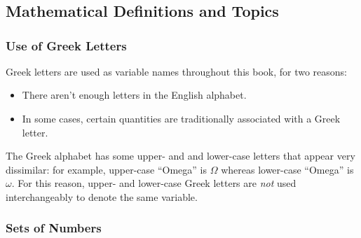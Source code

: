 \chapter[\cmctzeroshorttitle{}]{\cmctzeroshorttitle{}}

\label{cmct0}

\section{Mathematical Definitions and Topics}
\label{cmct0:smtp0}


\subsection{Use of Greek Letters}
\label{cmct0:smtp0:sugl0}

Greek letters are used as variable names throughout this book, for two
reasons:

\begin{itemize}
   \item There aren't enough letters in the English alphabet.
   \item In some cases, certain quantities are traditionally associated with
         a Greek letter.
\end{itemize}

The Greek alphabet has some upper- and and lower-case letters that appear
very dissimilar:  for example, upper-case ``Omega'' is $\Omega$ whereas
lower-case ``Omega'' is $\omega$.  For this reason, upper- and lower-case
Greek letters are \emph{not} used interchangeably to denote the same variable.


\subsection{Sets of Numbers}
\label{cmct0:smtp0:ssnm0}

